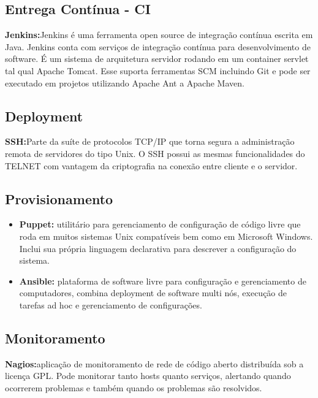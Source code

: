 \subsection{Entrega Contínua - CI}
\textbf{Jenkins:}Jenkins é uma ferramenta open source de integração contínua escrita em Java. Jenkins conta com serviços de integração contínua para desenvolvimento de software. É um sistema de arquitetura servidor rodando em um container servlet tal qual Apache Tomcat. Esse suporta ferramentas SCM incluindo Git e pode ser executado em projetos utilizando Apache Ant a Apache Maven.

\subsection{Deployment}
\textbf{SSH:}Parte da suíte de protocolos TCP/IP que torna segura a administração remota de servidores do tipo Unix. O SSH possui as mesmas funcionalidades do TELNET com vantagem da criptografia na conexão entre cliente e o servidor.

\subsection{Provisionamento}

\begin{itemize}

\item \textbf{Puppet:} utilitário para gerenciamento de configuração de código livre que roda em muitos sistemas Unix compatíveis bem como em Microsoft Windows. Inclui sua própria linguagem declarativa para descrever a configuração do sistema.

\item \textbf{Ansible:} plataforma de software livre para configuração e gerenciamento de computadores, combina deployment de software multi nós, execução de tarefas ad hoc e gerenciamento de configurações.

\end{itemize}

\subsection{Monitoramento}

\textbf{Nagios:}aplicação de monitoramento de rede de código aberto distribuída sob a licença GPL. Pode monitorar tanto hosts quanto serviços, alertando quando ocorrerem problemas e também quando os problemas são resolvidos.

